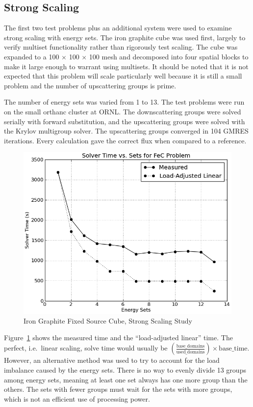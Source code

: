 \subsection{Strong Scaling}
The first two test problems plus an additional system were used to examine strong scaling with energy sets. The iron graphite cube was used first, largely to verify multiset functionality rather than rigorously test scaling. The cube was expanded to a 100 $\times$ 100 $\times$ 100 mesh and decomposed into four spatial blocks to make it large enough to warrant using multisets. It should be noted that it is not expected that this problem will scale particularly well because it is still a small problem and the number of upscattering groups is prime. 

The number of energy sets was varied from 1 to 13. The test problems were run on the small orthanc cluster at ORNL. The downscattering groups were solved serially with forward substitution, and the upscattering groups were solved with the Krylov multigroup solver. The upscattering groups converged in 104 GMRES iterations. Every calculation gave the correct flux when compared to a reference.

\begin{figure}[!h]
  \begin{center}
    \includegraphics [width=.75\textwidth, height=0.45\textheight ] {FeCKrylovMultisets}
  \end{center}
  \caption{Iron Graphite Fixed Source Cube, Strong Scaling Study}
  \label{fig:FeGraphiteStudy}
\end{figure}
%
Figure~\ref{fig:FeGraphiteStudy} shows the measured time and the ``load-adjusted linear'' time. The perfect, i.e.\ linear scaling, solve time would usually be $(\frac{\text{base\_domains}}{\text{used\_domains}}) \times \text{base\_time}$. However, an alternative method was used to try to account for the load imbalance caused by the energy sets. There is no way to evenly divide 13 groups among energy sets, meaning at least one set always has one more group than the others. The sets with fewer groups must wait for the sets with more groups, which is not an efficient use of processing power. 

